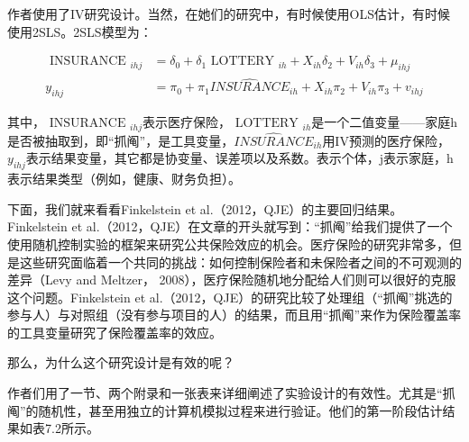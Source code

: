 \documentclass[cn,12pt,math=newtx,citestyle=gb7714-2015,bibstyle=gb7714-2015]{elegantbook}
\begin{document}
	作者使用了IV研究设计。当然，在她们的研究中，有时候使用OLS估计，有时候使用2SLS。2SLS模型为：
	
	\begin{equation}
		\begin{aligned}
			\text { INSURANCE }_{i h j} &=\delta_{0}+\delta_{1} \text { LOTTERY }_{i h}+X_{i h} \delta_{2}+V_{i h} \delta_{3}+\mu_{i h j} \\
			y_{i h j} &=\pi_{0}+\pi_{1} \hat{INSURANCE}_{i h}+X_{i h} \pi_{2}+V_{i h} \pi_{3}+v_{i h j}
		\end{aligned}
	\end{equation}
	
	其中，$\text { INSURANCE }_{i h j}$表示医疗保险，$\text { LOTTERY }_{i h}$是一个二值变量——家庭h是否被抽取到，即“抓阄”，是工具变量，$\hat{INSURANCE}_{i h}$用IV预测的医疗保险，$y_{i h j}$表示结果变量，其它都是协变量、误差项以及系数。表示个体，j表示家庭，h表示结果类型（例如，健康、财务负担）。
	
	下面，我们就来看看Finkelstein et al.（2012，QJE）的主要回归结果。Finkelstein et al.（2012，QJE）在文章的开头就写到：“抓阄”给我们提供了一个使用随机控制实验的框架来研究公共保险效应的机会。医疗保险的研究非常多，但是这些研究面临着一个共同的挑战：如何控制保险者和未保险者之间的不可观测的差异（Levy and Meltzer， 2008），医疗保险随机地分配给人们则可以很好的克服这个问题。Finkelstein et al.（2012，QJE）的研究比较了处理组（“抓阄”挑选的参与人）与对照组（没有参与项目的人）的结果，而且用“抓阄”来作为保险覆盖率的工具变量研究了保险覆盖率的效应。
	
	那么，为什么这个研究设计是有效的呢？
	
	作者们用了一节、两个附录和一张表来详细阐述了实验设计的有效性。尤其是“抓阄”的随机性，甚至用独立的计算机模拟过程来进行验证。他们的第一阶段估计结果如表7.2所示。
	
\end{document}
